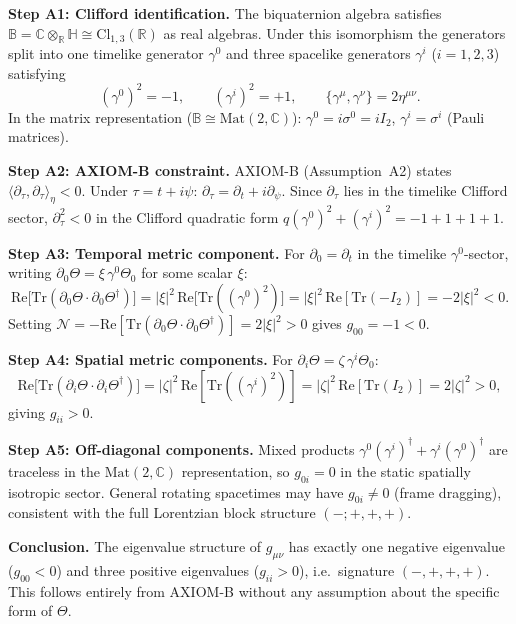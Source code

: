 \documentclass[12pt,a4paper]{article}
\theoremstyle{definition}
\theoremstyle{remark}
\newcommand{\B}{\mathbb{B}}
\newcommand{\R}{\mathbb{R}}
\newcommand{\C}{\mathbb{C}}
\newcommand{\Hquat}{\mathbb{H}}
\newcommand{\gmn}{g_{\mu\nu}}
\newcommand{\Tr}{\mathrm{Tr}}
\newcommand{\Re}{\mathrm{Re}}
\newcommand{\pT}{\partial_\tau}
\begin{document}
\textbf{Step A1: Clifford identification.}
The biquaternion algebra satisfies
$\B = \C\otimes_\R\Hquat \cong \mathrm{Cl}_{1,3}(\R)$ as real algebras.
Under this isomorphism the generators split into one timelike generator $\gamma^0$
and three spacelike generators $\gamma^i$ ($i=1,2,3$) satisfying
\[
  (\gamma^0)^2 = -1, \qquad (\gamma^i)^2 = +1, \qquad
  \{\gamma^\mu,\gamma^\nu\} = 2\eta^{\mu\nu}.
\]
In the matrix representation ($\B \cong \mathrm{Mat}(2,\C)$):
$\gamma^0 = i\sigma^0 = iI_2$, $\gamma^i = \sigma^i$ (Pauli matrices).

\textbf{Step A2: AXIOM-B constraint.}
AXIOM-B (Assumption~A2) states $\langle\pT,\pT\rangle_\eta < 0$.
Under $\tau = t + i\psi$:
$\pT = \partial_t + i\partial_\psi$.
Since $\pT$ lies in the timelike Clifford sector,
$\pT^2 < 0$ in the Clifford quadratic form $q(\gamma^0)^2 + (\gamma^i)^2 = -1+1+1+1$.

\textbf{Step A3: Temporal metric component.}
For $\partial_0 = \partial_t$ in the timelike $\gamma^0$-sector, writing
$\partial_0\Theta = \xi\,\gamma^0\Theta_0$ for some scalar $\xi$:
\[
  \Re\bigl[\Tr(\partial_0\Theta\cdot\partial_0\Theta^\dagger)\bigr]
  = |\xi|^2\,\Re\bigl[\Tr((\gamma^0)^2)\bigr]
  = |\xi|^2\,\Re[\Tr(-I_2)]
  = -2|\xi|^2 < 0.
\]
Setting $\mathcal{N} = -\Re[\Tr(\partial_0\Theta\cdot\partial_0\Theta^\dagger)]
= 2|\xi|^2 > 0$ gives $g_{00} = -1 < 0$.

\textbf{Step A4: Spatial metric components.}
For $\partial_i\Theta = \zeta\,\gamma^i\Theta_0$:
\[
  \Re\bigl[\Tr(\partial_i\Theta\cdot\partial_i\Theta^\dagger)\bigr]
  = |\zeta|^2\,\Re[\Tr((\gamma^i)^2)]
  = |\zeta|^2\,\Re[\Tr(I_2)]
  = 2|\zeta|^2 > 0,
\]
giving $g_{ii} > 0$.

\textbf{Step A5: Off-diagonal components.}
Mixed products $\gamma^0(\gamma^i)^\dagger + \gamma^i(\gamma^0)^\dagger$
are traceless in the $\mathrm{Mat}(2,\C)$ representation, so $g_{0i} = 0$ in
the static spatially isotropic sector.  General rotating spacetimes may have
$g_{0i} \neq 0$ (frame dragging), consistent with the full Lorentzian block
structure $(-;+,+,+)$.

\textbf{Conclusion.}
The eigenvalue structure of $\gmn$ has exactly one negative eigenvalue
($g_{00} < 0$) and three positive eigenvalues ($g_{ii} > 0$), i.e.\ signature
$(-,+,+,+)$.  This follows entirely from AXIOM-B without any assumption about
the specific form of $\Theta$.
\end{document}
